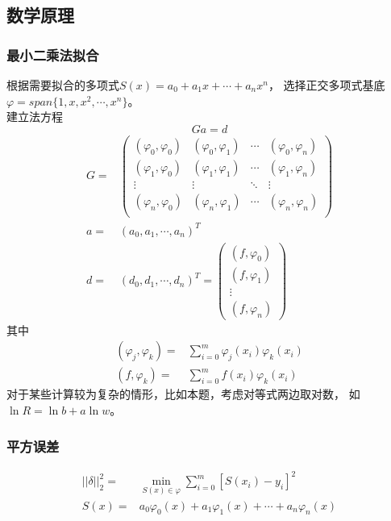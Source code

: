 \documentclass{article}
\begin{document}
\subsection{数学原理}
\subsubsection{最小二乘法拟合}
根据需要拟合的多项式$S(x)=a_0+a_1x+\cdots+a_nx^n$，
选择正交多项式基底
$\varphi=span\{1,x,x^2,\cdots,x^n\}$。\\
建立法方程
\begin{equation}
    Ga = d 
\end{equation}
\begin{align}
    G = &
    \begin{pmatrix} 
        (\varphi_0,\varphi_0) & (\varphi_0,\varphi_1) & \cdots & (\varphi_0,\varphi_n) \\
        (\varphi_1,\varphi_0) & (\varphi_1,\varphi_1) & \cdots & (\varphi_1,\varphi_n) \\
        \vdots & \vdots & \ddots & \vdots \\
        (\varphi_n,\varphi_0) & (\varphi_n,\varphi_1) & \cdots & (\varphi_n,\varphi_n) \\
    \end{pmatrix} \\
    a = & (a_0, a_1, \cdots, a_n)^T \\
    d = & (d_0, d_1, \cdots, d_n)^T = 
    \begin{pmatrix}
        (f,\varphi_0) \\
        (f,\varphi_1) \\
        \vdots \\
        (f,\varphi_n)
    \end{pmatrix} 
\end{align}
其中
\begin{align}
    (\varphi_j, \varphi_k) = & \sum_{i=0}^m\varphi_j(x_i)\varphi_k(x_i) \\
    (f, \varphi_k) = & \sum_{i=0}^mf(x_i)\varphi_k(x_i) 
\end{align}
对于某些计算较为复杂的情形，比如本题，考虑对等式两边取对数，
如$\ln R = \ln b + a\ln w$。
\subsubsection{平方误差}
\begin{align}
    ||\delta||_2^2 = & \min_{S(x)\in\varphi} \sum_{i=0}^{m}[S(x_i)-y_i]^2 \\
    S(x) = & a_0\varphi_0(x) + a_1\varphi_1(x) + \cdots + a_n\varphi_n(x) 
\end{align}
\end{document}
